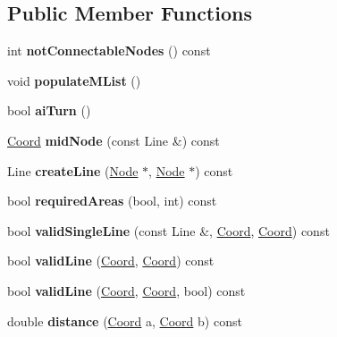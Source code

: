 \subsection*{Public Member Functions}
\begin{DoxyCompactItemize}
\item 
\hypertarget{classGameAI_ab36abdfff623feb9e4541c59752c2132}{int {\bfseries not\+Connectable\+Nodes} () const }\label{classGameAI_ab36abdfff623feb9e4541c59752c2132}

\item 
\hypertarget{classGameAI_a90f4924b104ca8a98b054cc4d12c779c}{void {\bfseries populate\+M\+List} ()}\label{classGameAI_a90f4924b104ca8a98b054cc4d12c779c}

\item 
\hypertarget{classGameAI_a12c06fd7a0c68da5af485e41048f0cc7}{bool {\bfseries ai\+Turn} ()}\label{classGameAI_a12c06fd7a0c68da5af485e41048f0cc7}

\item 
\hypertarget{classGameAI_afe0272443eed1a1392caf8c19380e502}{\hyperlink{structCoord}{Coord} {\bfseries mid\+Node} (const Line \&) const }\label{classGameAI_afe0272443eed1a1392caf8c19380e502}

\item 
\hypertarget{classGameAI_ad21315504d9b3bd4c00ce9effcd3909e}{Line {\bfseries create\+Line} (\hyperlink{structNode}{Node} $\ast$, \hyperlink{structNode}{Node} $\ast$) const }\label{classGameAI_ad21315504d9b3bd4c00ce9effcd3909e}

\item 
\hypertarget{classGameAI_a3f36972f212c2f0b65c03c0674d0383b}{bool {\bfseries required\+Areas} (bool, int) const }\label{classGameAI_a3f36972f212c2f0b65c03c0674d0383b}

\item 
\hypertarget{classGameAI_a4c6c1706af32bb21c81d8b5c2c4d37d9}{bool {\bfseries valid\+Single\+Line} (const Line \&, \hyperlink{structCoord}{Coord}, \hyperlink{structCoord}{Coord}) const }\label{classGameAI_a4c6c1706af32bb21c81d8b5c2c4d37d9}

\item 
\hypertarget{classGameAI_ac6a810b45dfec6db6d4f53f5c96106b3}{bool {\bfseries valid\+Line} (\hyperlink{structCoord}{Coord}, \hyperlink{structCoord}{Coord}) const }\label{classGameAI_ac6a810b45dfec6db6d4f53f5c96106b3}

\item 
\hypertarget{classGameAI_a2683127876773a7aa917deefe8ba6eeb}{bool {\bfseries valid\+Line} (\hyperlink{structCoord}{Coord}, \hyperlink{structCoord}{Coord}, bool) const }\label{classGameAI_a2683127876773a7aa917deefe8ba6eeb}

\item 
\hypertarget{classGameAI_ac49f4598c7f141ee226cc83e59c1c61d}{double {\bfseries distance} (\hyperlink{structCoord}{Coord} a, \hyperlink{structCoord}{Coord} b) const }\label{classGameAI_ac49f4598c7f141ee226cc83e59c1c61d}

\end{DoxyCompactItemize}
